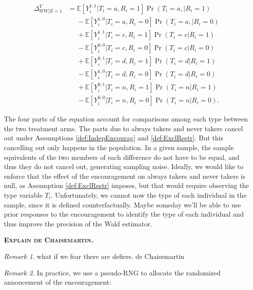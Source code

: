\documentclass[
]{book}
\newcommand{\esp}[1]{\mathbb{E}[ #1 ]}
\theoremstyle{definition}
\theoremstyle{definition}
\theoremstyle{definition}
\theoremstyle{definition}
\theoremstyle{remark}
\newtheorem*{remark}{Remark}
\begin{document}
\begin{align*}
  \Delta^Y_{WW|E=1} & = \esp{Y_i^{1,1}|T_i=a,R_i=1}\Pr(T_i=a,|R_i=1)\\
                    & \phantom{=}-\esp{Y_i^{1,0}|T_i=a,R_i=0}\Pr(T_i=a,|R_i=0)\\
                    & \phantom{=}+ \esp{Y_i^{1,1}|T_i=c,R_i=1}\Pr(T_i=c|R_i=1)\\
                    & \phantom{=}-\esp{Y_i^{0,0}|T_i=c,R_i=0}\Pr(T_i=c|R_i=0)\\
                    & \phantom{=}+ \esp{Y_i^{0,1}|T_i=d,R_i=1}\Pr(T_i=d|R_i=1)\\
                    & \phantom{=}-\esp{Y_i^{1,0}|T_i=d,R_i=0}\Pr(T_i=d|R_i=0)\\
                    & \phantom{=}+ \esp{Y_i^{0,1}|T_i=n,R_i=1}\Pr(T_i=n|R_i=1)\\
                    & \phantom{=}-\esp{Y_i^{0,0}|T_i=n,R_i=0}\Pr(T_i=n|R_i=0).
\end{align*}

The four parts of the equation account for comparisons among each type between the two treatment arms.
The parts due to always takers and never takers cancel out under Assumptions \ref{def:IndepEncourag} and \ref{def:ExclRestr}.
But this cancelling out only happens in the population.
In a given sample, the sample equivalents of the two members of each difference do not have to be equal, and thus they do not cancel out, generating sampling noise.
Ideally, we would like to enforce that the effect of the encouragement on always takers and never takers is null, as Assumption \ref{def:ExclRestr} imposes, but that would require observing the type variable \(T_i\).
Unfortunately, we cannot now the type of each individual in the sample, since it is defined counterfactually.
Maybe someday we'll be able to use prior responses to the encouragement to identify the type of each individual and thus improve the precision of the Wald estimator.

\textbf{\textsc{Explain de Chaisemartin.}}

\begin{remark}
\iffalse{} {Remark. } \fi{}what if we fear there are defiers.
de Chaisemartin
\end{remark}

\begin{remark}
\iffalse{} {Remark. } \fi{}In practice, we use a pseudo-RNG to allocate the randomized annoucement of the encouragement:
\end{remark}
\end{document}
